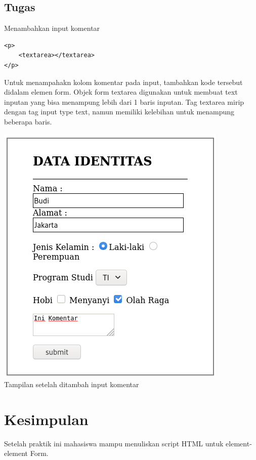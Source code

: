 \documentclass[a4paper,12pt]{article}
\begin{document}
\subsection{Tugas}
Menambahkan input komentar
\begin{lstlisting}[style=PHP]
<p>
    <textarea></textarea>
</p>
\end{lstlisting}
Untuk menampahakn kolom komentar pada input, tambahkan kode tersebut didalam elemen form. Objek form textarea digunakan
untuk membuat text inputan yang bisa menampung lebih dari 1 baris inputan. Tag textarea mirip dengan tag input type
text, namun memiliki kelebihan untuk menampung beberapa baris.\\
\begin{minipage}{\linewidth}
    \centering
    \includegraphics[scale=.8]{komen.png}\\
    \caption{Tampilan setelah ditambah input komentar}
\end{minipage}

\newpage

\section{Kesimpulan}
Setelah praktik ini mahasiswa mampu menuliskan script HTML untuk element-element Form.
\end{document}
